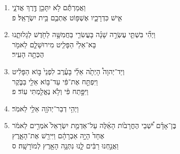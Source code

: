 \documentclass[12pt,a4paper,titlepage]{article}
\def \pslabelsep{-0.9em} %
\def \psleftmargin{0em} %
\begin{document}
\begin{enumerate}[leftmargin=\psleftmargin, labelsep = \pslabelsep, label={\arabic*}, font=\color{\pscolor}\small\textsuperscript, parsep=0em, itemsep=0em, topsep=0em ]
\item \texthebrew{וַאֲמַרְתֶּ֕ם לֹ֥א יִתָּכֵ֖ן דֶּ֣רֶךְ אֲדֹנָ֑י \\ אִ֧ישׁ כִּדְרָכָ֛יו אֶשְׁפּ֥וֹט אֶתְכֶ֖ם בֵּ֥ית יִשְׂרָאֵֽל׃ פ}\parSpace
\item \texthebrew{וַיְהִ֞י בִּשְׁתֵּ֧י עֶשְׂרֵ֣ה שָׁנָ֗ה בָּעֲשִׂרִ֛י בַּחֲמִשָּׁ֥ה לַחֹ֖דֶשׁ לְגָלוּתֵ֑נוּ \\ בָּא־אֵלַ֙י הַפָּלִ֧יט מִירוּשָׁלִַ֛ם לֵאמֹ֖ר \\ הֻכְּתָ֥ה הָעִֽיר׃}
\item \texthebrew{וְיַד־יְהוָה֩ הָיְתָ֙ה אֵלַ֜י בָּעֶ֗רֶב לִפְנֵי֙ בּ֣וֹא הַפָּלִ֔יט \\ וַיִּפְתַּ֣ח אֶת־פִּ֔י עַד־בּ֥וֹא אֵלַ֖י בַּבֹּ֑קֶר \\ וַיִּפָּ֣תַח פִּ֔י וְלֹ֥א נֶאֱלַ֖מְתִּי עֽוֹד׃ פ}\verseSpace
\item \texthebrew{וַיְהִ֥י דְבַר־יְהֹוָ֖ה אֵלַ֥י לֵאמֹֽר׃}
\item \texthebrew{בֶּן־אָדָ֗ם יֹ֠שְׁבֵי הֶחֳרָב֙וֹת הָאֵ֜לֶּה עַל־אַדְמַ֤ת יִשְׂרָאֵל֙ אֹמְרִ֣ים לֵאמֹ֔ר \\ אֶחָד֙ הָיָ֣ה אַבְרָהָ֔ם וַיִּירַ֖שׁ אֶת־הָאָ֑רֶץ \\ וַאֲנַ֣חְנוּ רַבִּ֔ים לָ֛נוּ נִתְּנָ֥ה הָאָ֖רֶץ לְמוֹרָשָֽׁה׃ ס}\verseSpace


\end{enumerate}
\end{document}
